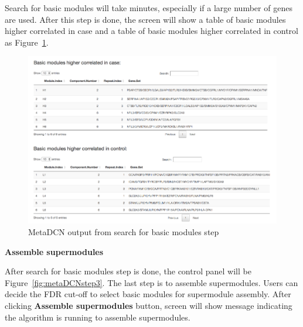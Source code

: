 \begin{steps}
Search for basic modules will take minutes, especially if a large number of genes are used. After this step is done, the screen will show a table of basic modules higher correlated in case and a table of basic modules higher correlated in control as Figure~\ref{fig:metaDCNBM}. 

\begin{figure}[H]
\begin{center}
\includegraphics[scale=0.8]{./figure/metaDCN/metaDCNBM}
\caption{MetaDCN output from search for basic modules step}
\label{fig:metaDCNBM}
\end{center}
\end{figure}

\item \textbf{Assemble supermodules}

After search for basic modules step is done, the control panel will be Figure~\ref{fig:metaDCNstep3}. The last step is to assemble supermodules. Users can decide the FDR cut-off to select basic modules for supermodule assembly. After clicking \textbf{Assemble supermodules} button, screen will show message indicating the algorithm is running to assemble supermodules.


\end{steps}
